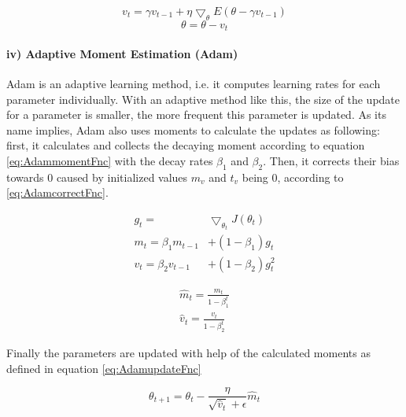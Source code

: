 	\begin{equation} \label{eq:nescerovFnc}
			v_t = \gamma v_{t-1} + {\eta}{\bigtriangledown_\theta}E(\theta - \gamma v_{t-1}) 
	\end{equation}
	\begin{equation} \label{eq:thetanescerovFnc}
			\theta = \theta - v_t
	\end{equation}

\paragraph*{iv) Adaptive Moment Estimation (Adam)} Adam \cite{adam} is an adaptive learning method, i.e. it computes learning rates for each parameter individually. With an adaptive method like this, the size of the update for a parameter is smaller, the more frequent this parameter is updated. As its name implies, Adam also uses moments to calculate the updates as following: first, it calculates and collects the decaying moment according to equation \eqref{eq:AdammomentFnc} with the decay rates $\beta_1$ and $\beta_2$. Then, it corrects their bias towards 0 caused by initialized values $m_v$ and $t_v$ being 0, according to \eqref{eq:AdamcorrectFnc}. 

	\begin{equation} \label{eq:AdammomentFnc}
		\begin{split}
			g_t = & {\bigtriangledown_{\theta_t}}J(\theta_t) \\
			m_t = \beta_1m_{t - 1} &+ (1 - \beta_1)g_t \\
			v_t = \beta_2v_{t - 1} &+ (1 - \beta_2)g^2_t
			\end{split}
	\end{equation}

	\begin{equation} \label{eq:AdamcorrectFnc}
	\begin{split}
		\hat{m}_t = \frac{m_t}{1 - \beta_1^t} \\
		\hat{v}_t = \frac{v_t}{1 - \beta_2^t}
	\end{split}
	\end{equation}

Finally the parameters are updated with help of the calculated moments as defined in equation \eqref{eq:AdamupdateFnc}

	\begin{equation} \label{eq:AdamupdateFnc}
			\theta_{t+1} = \theta_t - \frac{\eta}{\sqrt{\hat{v}_t} + \epsilon} \hat{m}_t 
	\end{equation}

